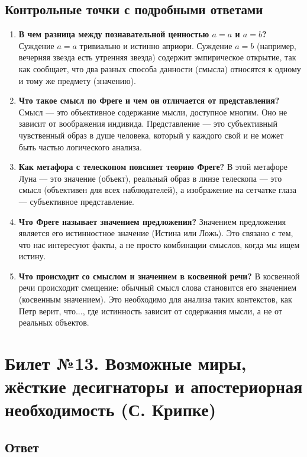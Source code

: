 \documentclass[a4paper,12pt]{article}
\begin{document}
\subsection{Контрольные точки с подробными ответами}

\begin{enumerate}
    \item \textbf{В чем разница между познавательной ценностью $a=a$ и $a=b$?}
    Суждение $a=a$ тривиально и истинно априори. Суждение $a=b$ (например, вечерняя звезда есть утренняя звезда) содержит эмпирическое открытие, так как сообщает, что два разных способа данности (смысла) относятся к одному и тому же предмету (значению).
    \item \textbf{Что такое смысл по Фреге и чем он отличается от представления?}
    Смысл — это объективное содержание мысли, доступное многим. Оно не зависит от воображения индивида. Представление — это субъективный чувственный образ в душе человека, который у каждого свой и не может быть частью логического анализа.
    \item \textbf{Как метафора с телескопом поясняет теорию Фреге?}
    В этой метафоре Луна — это значение (объект), реальный образ в линзе телескопа — это смысл (объективен для всех наблюдателей), а изображение на сетчатке глаза — субъективное представление.
    \item \textbf{Что Фреге называет значением предложения?}
    Значением предложения является его истинностное значение (Истина или Ложь). Это связано с тем, что нас интересуют факты, а не просто комбинации смыслов, когда мы ищем истину.
    \item \textbf{Что происходит со смыслом и значением в косвенной речи?}
    В косвенной речи происходит смещение: обычный смысл слова становится его значением (косвенным значением). Это необходимо для анализа таких контекстов, как Петр верит, что..., где истинность зависит от содержания мысли, а не от реальных объектов.
\end{enumerate}

\newpage
\section{Билет №13. Возможные миры, жёсткие десигнаторы и апостериорная необходимость (С. Крипке)}

\subsection{Ответ}
\end{document}
